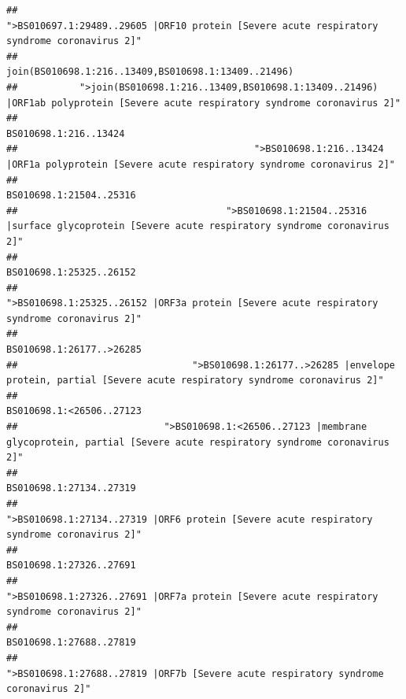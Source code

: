 \documentclass[
]{article}
\begin{document}
\begin{verbatim}
##                                            ">BS010697.1:29489..29605 |ORF10 protein [Severe acute respiratory syndrome coronavirus 2]" 
##                                                                                    join(BS010698.1:216..13409,BS010698.1:13409..21496) 
##           ">join(BS010698.1:216..13409,BS010698.1:13409..21496) |ORF1ab polyprotein [Severe acute respiratory syndrome coronavirus 2]" 
##                                                                                                                  BS010698.1:216..13424 
##                                          ">BS010698.1:216..13424 |ORF1a polyprotein [Severe acute respiratory syndrome coronavirus 2]" 
##                                                                                                                BS010698.1:21504..25316 
##                                     ">BS010698.1:21504..25316 |surface glycoprotein [Severe acute respiratory syndrome coronavirus 2]" 
##                                                                                                                BS010698.1:25325..26152 
##                                            ">BS010698.1:25325..26152 |ORF3a protein [Severe acute respiratory syndrome coronavirus 2]" 
##                                                                                                               BS010698.1:26177..>26285 
##                               ">BS010698.1:26177..>26285 |envelope protein, partial [Severe acute respiratory syndrome coronavirus 2]" 
##                                                                                                               BS010698.1:<26506..27123 
##                          ">BS010698.1:<26506..27123 |membrane glycoprotein, partial [Severe acute respiratory syndrome coronavirus 2]" 
##                                                                                                                BS010698.1:27134..27319 
##                                             ">BS010698.1:27134..27319 |ORF6 protein [Severe acute respiratory syndrome coronavirus 2]" 
##                                                                                                                BS010698.1:27326..27691 
##                                            ">BS010698.1:27326..27691 |ORF7a protein [Severe acute respiratory syndrome coronavirus 2]" 
##                                                                                                                BS010698.1:27688..27819 
##                                                    ">BS010698.1:27688..27819 |ORF7b [Severe acute respiratory syndrome coronavirus 2]" 

\end{verbatim}
\end{document}
